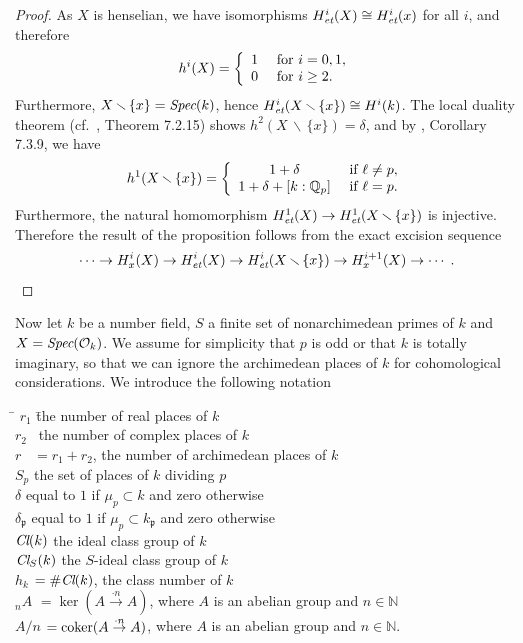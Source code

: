 \documentclass[10pt]{article}
\newcommand{\Spec}{\text{\it Spec}}
\newcommand{\Q}{{\mathbb Q}}
\newcommand{\N}{{\mathbb N}}
\renewcommand{\O}{{\mathcal{O}}}
\newcommand{\Cl}{\text{\it Cl}}
\newcommand{\p}{{\mathfrak p}}
\newcommand{\sm}{{\,\smallsetminus\,}}
\newcommand{\et}{\text{\it et}}
\newcommand{\coker}{\text{\rm coker}}
\theoremstyle{alex}
\theoremstyle{alexdef}
\begin{document}
\begin{proof}
As $X$ is henselian, we have isomorphisms $H^i_\et(X) \cong H^i_\et(x)$ for all $i$, and therefore
\[
h^i(X)= \left\{
\begin{array}{cl}
1 & \hbox{ for } i=0,1,\\
0 & \hbox{ for } i\geq 2.
\end{array}
\right.
\]
Furthermore, $X\sm \{x\}=\Spec(k)$, hence $H^i_\et(X\sm \{x\})\cong H^i(k)$. The local duality theorem (cf.\ \cite{NSW}, Theorem 7.2.15) shows $h^2(X\sm \{ x\})=\delta$, and by \cite{NSW}, Corollary 7.3.9, we have
\[
h^1(X\sm \{ x\})= \left\{
\begin{array}{cl}
1+\delta & \hbox{ if } \ell\neq p,\\
1+\delta+[k:\Q_p] & \hbox{ if } \ell=p.
\end{array}
\right.
\]
Furthermore, the natural homomorphism $H^1_\et(X) \to H^1_\et(X\sm \{ x\})$ is injective. Therefore the result of the proposition follows from the exact excision sequence
\[
\cdots \to H^i_x(X) \to H^i_\et(X) \to H^i_\et(X\sm \{x\}) \to H^{i+1}_x(X) \to \cdots\;.
\]
\end{proof}

Now let $k$ be a number field, $S$ a finite set of nonarchimedean primes of $k$ and $X=\Spec(\O_k)$.  We assume for simplicity that $p$ is odd or that $k$ is totally imaginary, so that we can ignore the archimedean places of $k$ for cohomological considerations. We introduce the following notation
\begin{tabbing}
\quad \= $r_1$\hspace*{1cm} \= the number of real places of $k$\\
\>$r_2$\ \> the number of complex places of $k$\\
\>$r$\ \> $=r_1+r_2$, the number of  archimedean places of $k$\\
\> $S_p$ \> the set of places of $k$ dividing $p$\\
\> $\delta$ \> equal to $1$ if $\mu_p\subset k$ and zero otherwise\\
\> $\delta_\p$ \> equal to $1$ if $\mu_p\subset k_\p$ and zero otherwise\\
\> $\Cl(k)$\> the ideal class group of $k$\\
\> $\Cl_S(k)$\> the $S$-ideal class group of $k$\\
\> $h_k$\> $=\# \Cl(k)$, the class number of $k$\\
\> $_n A$\> $=\ker(A \stackrel{\cdot n}{\to} A)$, where $A$ is an abelian group and $n\in \N$ \\
\> $A/n$\> $=\coker(A \stackrel{\cdot n}{\to} A)$, where $A$ is an abelian group and $n\in \N$.
\end{tabbing}
\end{document}

